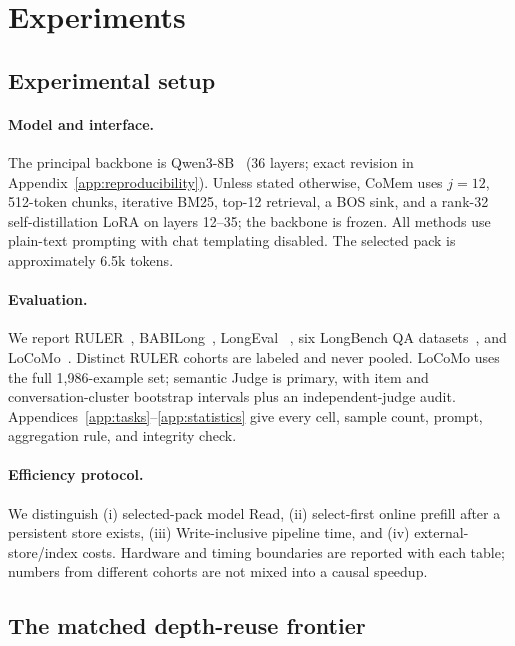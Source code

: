 \section{Experiments}
\label{sec:experiments}

\subsection{Experimental setup}
\paragraph{Model and interface.}
The principal backbone is Qwen3-8B~\citep{qwen3} (36 layers; exact revision in
Appendix~\ref{app:reproducibility}). Unless stated otherwise, CoMem uses
$j{=}12$, 512-token chunks, iterative BM25, top-12 retrieval, a BOS sink, and
a rank-32 self-distillation LoRA on layers 12--35; the backbone is frozen.
All methods use plain-text prompting with chat templating disabled. The
selected pack is approximately 6.5k tokens.

\paragraph{Evaluation.}
We report RULER~\citep{ruler}, BABILong~\citep{babilong}, LongEval
~\citep{longchat}, six LongBench QA datasets~\citep{longbench}, and
LoCoMo~\citep{locomo}. Distinct RULER cohorts are labeled and never pooled.
LoCoMo uses the full 1,986-example set; semantic Judge is primary, with item and
conversation-cluster bootstrap intervals plus an independent-judge audit.
Appendices~\ref{app:tasks}--\ref{app:statistics} give every cell, sample count,
prompt, aggregation rule, and integrity check.

\paragraph{Efficiency protocol.}
We distinguish (i) selected-pack model Read, (ii) select-first online prefill
after a persistent store exists, (iii) Write-inclusive pipeline time, and
(iv) external-store/index costs. Hardware and timing boundaries are reported
with each table; numbers from different cohorts are not mixed into a causal
speedup.

\subsection{The matched depth-reuse frontier}


